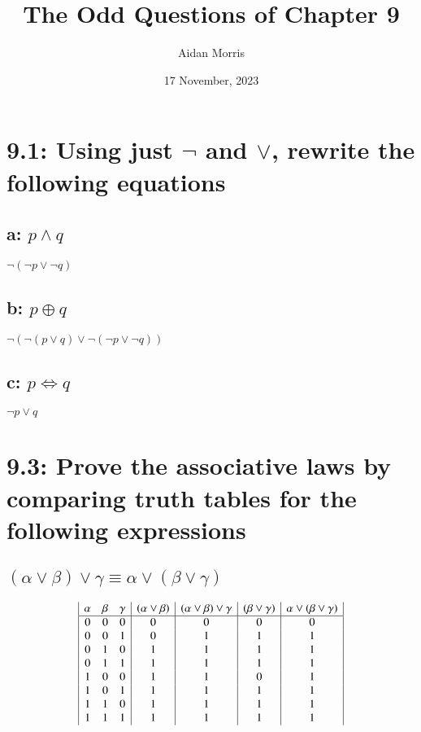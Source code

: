 \documentclass{article}
\title{The Odd Questions of Chapter 9}
\author{Aidan Morris}
\date{17 November, 2023}
\begin{document}
\maketitle
\pagebreak

\section*{9.1: Using just $\neg$ and $\lor$, rewrite the following equations}
\subsection*{a: $p \land q$}
$\neg(\neg p \lor \neg q)$
\subsection*{b: $p \oplus q$}
$\neg(\neg(p \lor q) \lor \neg(\neg p \lor \neg q))$
\subsection*{c: $p \Leftrightarrow q$}
$\neg p \lor q$
\section*{9.3: Prove the associative laws by comparing truth tables for the following expressions}
\subsection*{$(\alpha \lor \beta) \lor \gamma \equiv \alpha \lor (\beta \lor \gamma)$}
\begin{displaymath}
  \begin{array}{|c c c|c|c|c|c|}
    \alpha & \beta & \gamma & (\alpha \lor \beta) & (\alpha \lor \beta) \lor \gamma & (\beta \lor \gamma) & \alpha \lor (\beta \lor \gamma)\\
    \hline
    0 & 0 & 0 & 0 & 0 & 0 & 0\\
    0 & 0 & 1 & 0 & 1 & 1 & 1\\
    0 & 1 & 0 & 1 & 1 & 1 & 1\\
    0 & 1 & 1 & 1 & 1 & 1 & 1\\
    1 & 0 & 0 & 1 & 1 & 0 & 1\\
    1 & 0 & 1 & 1 & 1 & 1 & 1\\
    1 & 1 & 0 & 1 & 1 & 1 & 1\\
    1 & 1 & 1 & 1 & 1 & 1 & 1\\
  \end{array}
\end{displaymath}
\end{document}
